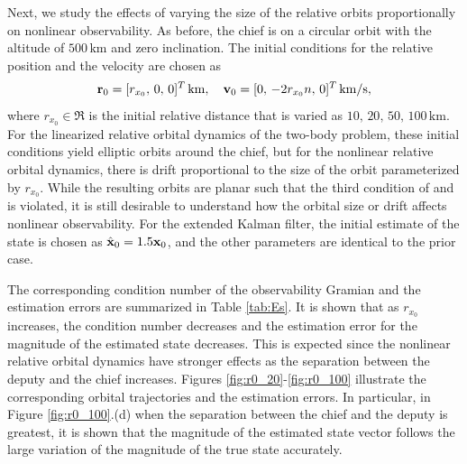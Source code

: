 Next, we study the effects of varying the size of the relative orbits proportionally on nonlinear observability. As before, the chief is on a circular orbit with the altitude of $500\,\mathrm{km}$ and zero inclination. The initial conditions for the relative position and the velocity are chosen as
\begin{gather*}
\mathbf{r}_0=[r_{x_0},\,0,\,0]^T\,\mathrm{km},\quad
\mathbf{v}_0=[0,\,-2r_{x_0}n,\,0]^T\,\mathrm{km/s},
\end{gather*}
where $r_{x_0}\in\Re$ is the initial relative distance that is varied as $10,\,20,\,50,\,100\,\mathrm{km}$. For the linearized relative orbital dynamics of the two-body problem, these initial conditions yield elliptic orbits around the chief, but for the nonlinear relative orbital dynamics, there is drift proportional to the size of the orbit parameterized by $r_{x_0}$. While the resulting orbits are planar such that the third condition of  and  is violated, it is still desirable to understand how the orbital size or drift affects nonlinear observability. For the extended Kalman filter, the initial estimate of the state is chosen as $\hat{\mathbf{x}}_0=1.5\mathbf{x}_0$, and the other parameters are identical to the prior case. 

The corresponding condition number of the observability Gramian and the estimation errors are summarized in Table \ref{tab:Es}. It is shown that as $r_{x_0}$ increases, the condition number decreases and the estimation error for the magnitude of the estimated state decreases. This is expected since the nonlinear relative orbital dynamics have stronger effects as the separation between the deputy and the chief increases. Figures \ref{fig:r0_20}-\ref{fig:r0_100} illustrate the corresponding orbital trajectories and the estimation errors. In particular, in Figure \ref{fig:r0_100}.(d) when the separation between the chief and the deputy is greatest, it is shown that the magnitude of the estimated state vector follows the large variation of the magnitude of the true state accurately.



